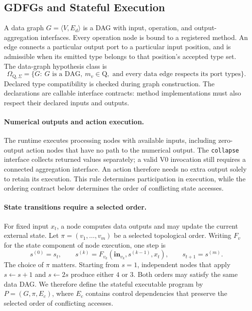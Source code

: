 \subsection{GDFGs and Stateful Execution}
\label{sec:gdfg}
A data graph $G=\langle V,E_d\rangle$ is a DAG with input, operation, and output-aggregation interfaces. Every operation node is bound to a registered method. An edge connects a particular output port to a particular input position, and is admissible when its emitted type belongs to that position's accepted type set. The data-graph hypothesis class is
\begin{equation}
\label{eq:expression_space}
\Omega_{\mathrm Q,\Sigma}=\{G:\ G\text{ is a DAG},\ m_v\in\mathrm Q,
\text{ and every data edge respects its port types}\}.
\end{equation}
Declared type compatibility is checked during graph construction. The declarations are callable interface contracts: method implementations must also respect their declared inputs and outputs.

\paragraph{Numerical outputs and action execution.}
The runtime executes processing nodes with available inputs, including zero-output action nodes that have no path to the numerical output. The \texttt{collapse} interface collects returned values separately; a valid V0 invocation still requires a connected aggregation interface. An action therefore needs no extra output solely to retain its execution. This rule determines participation in execution, while the ordering contract below determines the order of conflicting state accesses.

\paragraph{State transitions require a selected order.}
For fixed input $x_t$, a node computes data outputs and may update the current external state. Let $\pi=(v_1,\ldots,v_m)$ be a selected topological order. Writing $F_v$ for the state component of node execution, one step is
\begin{equation}
\label{eq:state_transition}
s^{(0)}=s_t,\qquad
s^{(k)}=F_{v_k}(\mathbf{in}_{v_k},s^{(k-1)},x_t),\qquad
s_{t+1}=s^{(m)}.
\end{equation}
The choice of $\pi$ matters. Starting from $s=1$, independent nodes that apply $s\leftarrow s+1$ and $s\leftarrow2s$ produce either $4$ or $3$. Both orders may satisfy the same data DAG. We therefore define the stateful executable program by $P=(G,\pi,E_c)$, where $E_c$ contains control dependencies that preserve the selected order of conflicting accesses.

